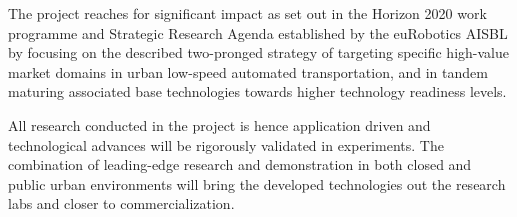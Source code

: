 

The \Project{} project reaches for significant impact as set out in the Horizon 2020 work programme and Strategic Research Agenda established by the euRobotics AISBL by focusing on the described two-pronged strategy of targeting specific high-value market domains in urban low-speed automated transportation, and in tandem maturing associated base technologies towards higher technology readiness levels.

All research conducted in the project is hence application driven and technological advances will be rigorously validated in experiments. The combination of leading-edge research and demonstration in both closed and public urban environments will bring the developed technologies out the research labs and closer to commercialization.

